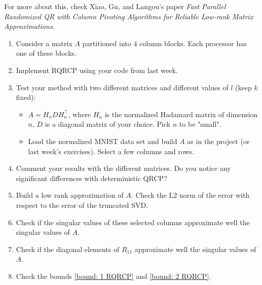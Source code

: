 \documentclass[11pt]{article}
\begin{document}
For more about this, check Xiao, Gu, and Langou's paper \textit{Fast Parallel Randomized QR with Column Pivoting Algorithms for
Reliable Low-rank Matrix Approximations}.


\begin{enumerate}
   \item Consider a matrix $A$ partitioned into $4$ column blocks. Each processor has one of these blocks.
   \item Implement RQRCP using your code from last week.
   \item Test your method with two different matrices and different values of $l$ (keep $k$ fixed): 
   \begin{itemize}
       \item $A = H_{n}DH_{n}^{\top}$, where $H_{n}$ is the normalized Hadamard matrix of dimension $n$, $D$ is a diagonal matrix of your choice. Pick $n$ to be "small".
       \item Load the normalized MNIST data set and build $A$ as in the project (or last week's exercises). Select a few columns and rows.
   \end{itemize}
   \item Comment your results with the different matrices. Do you notice any significant differences with deterministic QRCP?
   \item Build a low rank approximation of $A$. Check the L2 norm of the error with respect to the error of the truncated SVD.
   \item Check if the singular values of these selected columns approximate well the singular values of $A$.
   \item Check if the diagonal elements of $R_{11}$ approximate well the singular values of $A$.
   \item Check the bounds \ref{bound: 1 RQRCP} and \ref{bound: 2 RQRCP}.
\end{enumerate}
\end{document}
